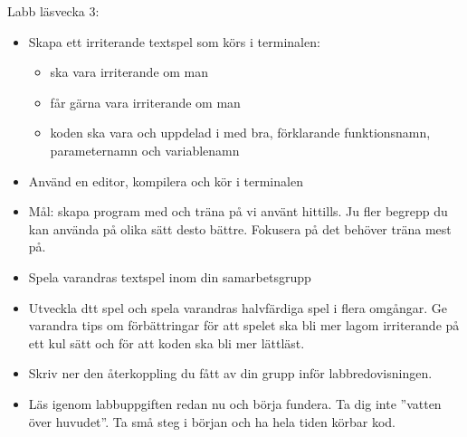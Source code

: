 \begin{Slide}{Labb läsvecka 3:  \texttt{\LabWeekTHREE}}\SlideFontSmall
\begin{itemize}
\item Skapa ett  irriterande textspel som körs i terminalen:
\begin{itemize}\SlideFontTiny
  \item ska vara  irriterande om man 
  \item får gärna vara  irriterande om man 
  \item koden ska vara  och uppdelad i  med bra, förklarande funktionsnamn, parameternamn och variablenamn
\end{itemize}
\item Använd en editor, kompilera och kör i terminalen
\item Mål: skapa  program med  och träna på  vi använt hittills. Ju fler begrepp du kan använda på olika sätt desto bättre. Fokusera på det  behöver träna mest på.
\item Spela varandras textspel inom din samarbetsgrupp
\item Utveckla dtt spel  och spela varandras halvfärdiga spel i flera omgångar. Ge varandra tips om förbättringar för att spelet ska bli mer lagom irriterande på ett kul sätt och för att koden ska bli mer lättläst.
\item Skriv ner den återkoppling du fått av din grupp inför labbredovisningen.
\item Läs igenom labbuppgiften redan nu och börja fundera. Ta dig inte ''vatten över huvudet''. Ta små steg i början och ha hela tiden körbar kod.


\end{itemize}
\end{Slide}
\fi
